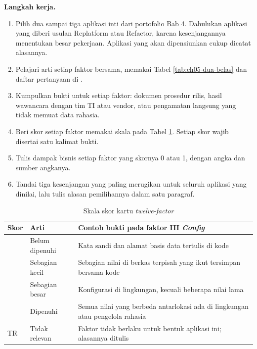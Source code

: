 \textbf{Langkah kerja.}
\begin{enumerate}
  \item Pilih dua sampai tiga aplikasi inti dari portofolio Bab 4. Dahulukan aplikasi yang
        diberi usulan Replatform atau Refactor, karena kesenjangannya menentukan besar
        pekerjaan. Aplikasi yang akan dipensiunkan cukup dicatat alasannya.
  \item Pelajari arti setiap faktor bersama, memakai Tabel \ref{tab:ch05-dua-belas} dan
        daftar pertanyaan di .
  \item Kumpulkan bukti untuk setiap faktor: dokumen prosedur rilis, hasil wawancara dengan
        tim TI atau vendor, atau pengamatan langsung yang tidak memuat data rahasia.
  \item Beri skor setiap faktor memakai skala pada Tabel \ref{tab:ch05-skala-skor}. Setiap
        skor wajib disertai satu kalimat bukti.
  \item Tulis dampak bisnis setiap faktor yang skornya 0 atau 1, dengan angka dan sumber
        angkanya.
  \item Tandai tiga kesenjangan yang paling merugikan untuk seluruh aplikasi yang dinilai,
        lalu tulis alasan pemilihannya dalam satu paragraf.
\end{enumerate}

\begin{table}[!htb]
  \centering
  \footnotesize
  \caption{Skala skor kartu \textit{twelve-factor}}
  \label{tab:ch05-skala-skor}
  \begin{tabularx}{\textwidth}{>{\raggedright\arraybackslash}p{1.2cm}
    >{\raggedright\arraybackslash}p{2.4cm} >{\raggedright\arraybackslash}X}
    \hline
    \textbf{Skor} & \textbf{Arti} & \textbf{Contoh bukti pada faktor III \textit{Config}} \\
    \hline
    0 & Belum dipenuhi & Kata sandi dan alamat basis data tertulis di kode \\
    \hline
    1 & Sebagian kecil & Sebagian nilai di berkas terpisah yang ikut tersimpan bersama kode \\
    \hline
    2 & Sebagian besar & Konfigurasi di lingkungan, kecuali beberapa nilai lama \\
    \hline
    3 & Dipenuhi & Semua nilai yang berbeda antarlokasi ada di lingkungan atau pengelola
      rahasia \\
    \hline
    TR & Tidak relevan & Faktor tidak berlaku untuk bentuk aplikasi ini; alasannya ditulis \\
    \hline
  \end{tabularx}
\end{table}

